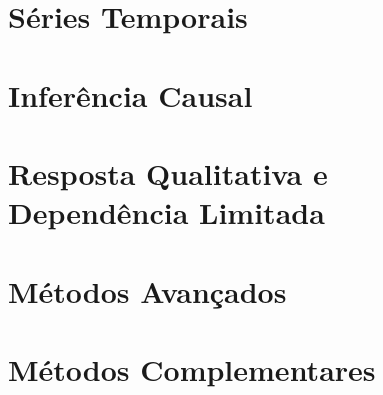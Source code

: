 \documentclass[12pt, a4paper, twoside, openright]{book}
\begin{document}










\part{Séries Temporais}







\part{Inferência Causal}




\part{Resposta Qualitativa e Dependência Limitada}






\part{Métodos Avançados}











\part{Métodos Complementares}









\end{document}
